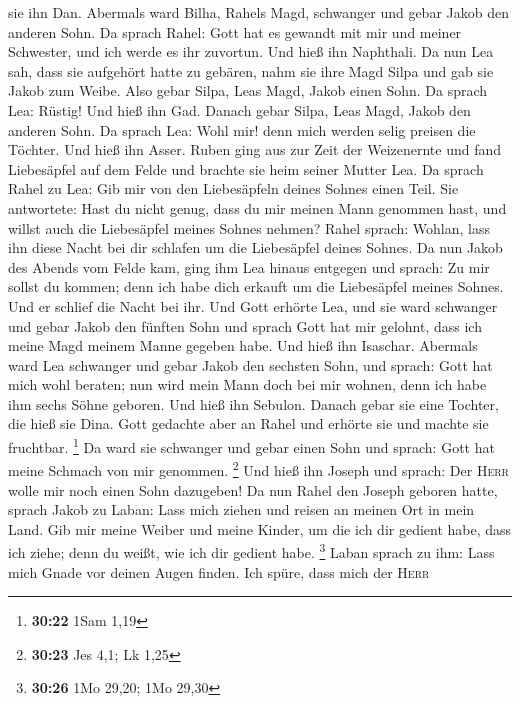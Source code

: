 sie ihn Dan.  Abermals ward Bilha, Rahels Magd, schwanger
und gebar Jakob den anderen Sohn.  Da sprach Rahel: Gott
hat es gewandt mit mir und meiner Schwester, und ich werde es ihr
zuvortun. Und hieß ihn Naphthali.  Da nun Lea sah, dass
sie aufgehört hatte zu gebären, nahm sie ihre Magd Silpa und gab sie
Jakob zum Weibe.  Also gebar Silpa, Leas Magd, Jakob
einen Sohn.  Da sprach Lea: Rüstig! Und hieß ihn Gad.
 Danach gebar Silpa, Leas Magd, Jakob den anderen Sohn.
 Da sprach Lea: Wohl mir! denn mich werden selig preisen
die Töchter. Und hieß ihn Asser.  Ruben ging aus zur Zeit
der Weizenernte und fand Liebesäpfel auf dem Felde und brachte sie heim
seiner Mutter Lea. Da sprach Rahel zu Lea: Gib mir von den Liebesäpfeln
deines Sohnes einen Teil.  Sie antwortete: Hast du nicht
genug, dass du mir meinen Mann genommen hast, und willst auch die
Liebesäpfel meines Sohnes nehmen? Rahel sprach: Wohlan, lass ihn diese
Nacht bei dir schlafen um die Liebesäpfel deines Sohnes. 
Da nun Jakob des Abends vom Felde kam, ging ihm Lea hinaus entgegen und
sprach: Zu mir sollst du kommen; denn ich habe dich erkauft um die
Liebesäpfel meines Sohnes. Und er schlief die Nacht bei ihr.
 Und Gott erhörte Lea, und sie ward schwanger und gebar
Jakob den fünften Sohn  und sprach Gott hat mir gelohnt,
dass ich meine Magd meinem Manne gegeben habe. Und hieß ihn Isaschar.
 Abermals ward Lea schwanger und gebar Jakob den sechsten
Sohn,  und sprach: Gott hat mich wohl beraten; nun wird
mein Mann doch bei mir wohnen, denn ich habe ihm sechs Söhne geboren.
Und hieß ihn Sebulon.  Danach gebar sie eine Tochter, die
hieß sie Dina.  Gott gedachte aber an Rahel und erhörte
sie und machte sie fruchtbar. \footnote{\textbf{30:22} 1Sam 1,19}
 Da ward sie schwanger und gebar einen Sohn und sprach:
Gott hat meine Schmach von mir genommen. \footnote{\textbf{30:23} Jes
  4,1; Lk 1,25}  Und hieß ihn Joseph und sprach: Der
\textsc{Herr} wolle mir noch einen Sohn dazugeben!  Da
nun Rahel den Joseph geboren hatte, sprach Jakob zu Laban: Lass mich
ziehen und reisen an meinen Ort in mein Land.  Gib mir
meine Weiber und meine Kinder, um die ich dir gedient habe, dass ich
ziehe; denn du weißt, wie ich dir gedient habe. \footnote{\textbf{30:26}
  1Mo 29,20; 1Mo 29,30}  Laban sprach zu ihm: Lass mich
Gnade vor deinen Augen finden. Ich spüre, dass mich der \textsc{Herr}
